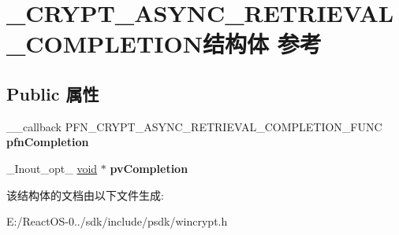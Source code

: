 \hypertarget{struct___c_r_y_p_t___a_s_y_n_c___r_e_t_r_i_e_v_a_l___c_o_m_p_l_e_t_i_o_n}{}\section{\+\_\+\+C\+R\+Y\+P\+T\+\_\+\+A\+S\+Y\+N\+C\+\_\+\+R\+E\+T\+R\+I\+E\+V\+A\+L\+\_\+\+C\+O\+M\+P\+L\+E\+T\+I\+O\+N结构体 参考}
\label{struct___c_r_y_p_t___a_s_y_n_c___r_e_t_r_i_e_v_a_l___c_o_m_p_l_e_t_i_o_n}
\subsection*{Public 属性}
\begin{DoxyCompactItemize}
\item 
\mbox{\label{struct___c_r_y_p_t___a_s_y_n_c___r_e_t_r_i_e_v_a_l___c_o_m_p_l_e_t_i_o_n_a5c64eff5e2468dd4a117fcd28cbbbc5e}} 
\+\_\+\+\_\+callback P\+F\+N\+\_\+\+C\+R\+Y\+P\+T\+\_\+\+A\+S\+Y\+N\+C\+\_\+\+R\+E\+T\+R\+I\+E\+V\+A\+L\+\_\+\+C\+O\+M\+P\+L\+E\+T\+I\+O\+N\+\_\+\+F\+U\+NC {\bfseries pfn\+Completion}
\item 
\mbox{\label{struct___c_r_y_p_t___a_s_y_n_c___r_e_t_r_i_e_v_a_l___c_o_m_p_l_e_t_i_o_n_a1e2032bcfa21502516915d233d666b45}} 
\+\_\+\+Inout\+\_\+opt\+\_\+ \hyperlink{interfacevoid}{void} $\ast$ {\bfseries pv\+Completion}
\end{DoxyCompactItemize}


该结构体的文档由以下文件生成\+:\begin{DoxyCompactItemize}
\item 
E\+:/\+React\+O\+S-\/0../sdk/include/psdk/wincrypt.\+h\end{DoxyCompactItemize}
